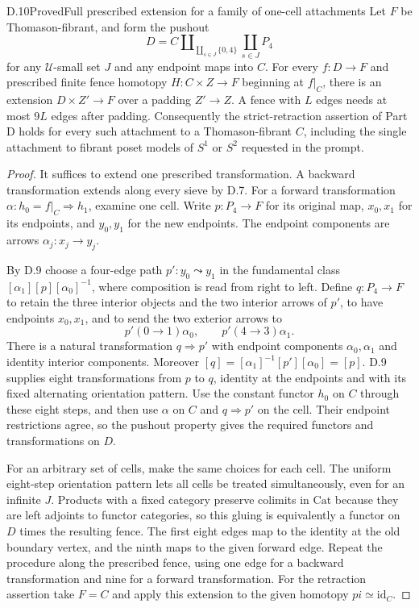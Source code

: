 \begin{claim}{D.10}{Proved}{Full prescribed extension for a family of one-cell attachments}
Let $F$ be Thomason-fibrant, and form the pushout
\[
 D=C\amalg_{\coprod_{s\in J}\{0,4\}}\coprod_{s\in J}P_4
\]
for any $\mathcal U$-small set $J$ and any endpoint maps into $C$. For every $f:D\to F$ and prescribed finite fence homotopy $H:C\times Z\to F$ beginning at $f|_C$, there is an extension $D\times Z'\to F$ over a padding $Z'\to Z$. A fence with $L$ edges needs at most $9L$ edges after padding. Consequently the strict-retraction assertion of Part D holds for every such attachment to a Thomason-fibrant $C$, including the single attachment to fibrant poset models of $S^1$ or $S^2$ requested in the prompt.
\end{claim}
\begin{proof}
It suffices to extend one prescribed transformation. A backward transformation extends along every sieve by D.7. For a forward transformation $\alpha:h_0=f|_C\Rightarrow h_1$, examine one cell. Write $p:P_4\to F$ for its original map, $x_0,x_1$ for its endpoints, and $y_0,y_1$ for the new endpoints. The endpoint components are arrows $\alpha_j:x_j\to y_j$.

By D.9 choose a four-edge path $p':y_0\leadsto y_1$ in the fundamental class
$[\alpha_1][p][\alpha_0]^{-1}$, where composition is read from right to left. Define $q:P_4\to F$ to retain the three interior objects and the two interior arrows of $p'$, to have endpoints $x_0,x_1$, and to send the two exterior arrows to
\[
 p'(0\to1)\alpha_0,
 \qquad p'(4\to3)\alpha_1.
\]
There is a natural transformation $q\Rightarrow p'$ with endpoint components $\alpha_0,\alpha_1$ and identity interior components. Moreover
$[q]=[\alpha_1]^{-1}[p'][\alpha_0]=[p]$.
D.9 supplies eight transformations from $p$ to $q$, identity at the endpoints and with its fixed alternating orientation pattern. Use the constant functor $h_0$ on $C$ through these eight steps, and then use $\alpha$ on $C$ and $q\Rightarrow p'$ on the cell. Their endpoint restrictions agree, so the pushout property gives the required functors and transformations on $D$.

For an arbitrary set of cells, make the same choices for each cell. The uniform eight-step orientation pattern lets all cells be treated simultaneously, even for an infinite $J$. Products with a fixed category preserve colimits in $\mathrm{Cat}$ because they are left adjoints to functor categories, so this gluing is equivalently a functor on $D$ times the resulting fence. The first eight edges map to the identity at the old boundary vertex, and the ninth maps to the given forward edge. Repeat the procedure along the prescribed fence, using one edge for a backward transformation and nine for a forward transformation. For the retraction assertion take $F=C$ and apply this extension to the given homotopy $pi\simeq\mathrm{id}_C$.
\end{proof}


